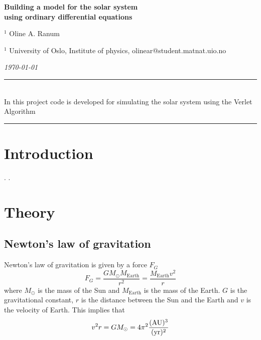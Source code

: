 \documentclass[%
reprint,nofootinbib,
amsmath,amssymb,
aps,
]{revtex4-1}
\newcommand{\HRule}{\rule{\textwidth}{0.5mm}}
\begin{document}
\onecolumngrid

\begin{center}
	\large\textbf{Building a model for the solar system \\ using ordinary differential equations}
\end{center}
\vspace{5mm}

\begin{center}
	\small{$^1$ Oline A. Ranum}\\
\end{center}

\begin{center}
	\small{$^1$ University of Oslo, Institute of physics, 
		olinear@student.matnat.uio.no}
\end{center}

\begin{center}
	\textit{\today}
\end{center}
\vspace{7mm}
\noindent 
\HRule \vspace{2mm}\\
	 In this project code is developed for simulating the solar system using the Verlet Algorithm 
\noindent 
\vspace{1.5mm}  \\
\HRule
\vspace{.2cm}


\section{Introduction} \noindent 
\vspace{3mm}
\twocolumngrid
\noindent 
\newpage. \newpage .\newpage 

\section{Theory} \noindent 
\subsection{Newton's law of gravitation}
Newton's law of gravitation is given by a force $F_G$
\begin{equation}
	F_G = \frac{GM_{\odot}M_{\mathrm{Earth}}}{r^2} = \frac{M_{\mathrm{Earth}}v^2}{r}
\end{equation}
where $M_{\odot}$ is the mass of the Sun and $M_{\mathrm{Earth}}$ is the mass of the Earth. $G$ is the gravitational constant, $r$ is the distance between the Sun and the Earth and $v$ is the velocity of Earth. This implies that
\begin{equation}\label{motion1}
	v^2r = GM_{\odot} = 4\pi^2\dfrac{(\textnormal{AU})^3}{(\textnormal{yr})^2}
\end{equation}
\end{document}
